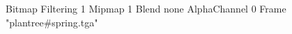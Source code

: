 {Bitmap
	{Filtering 1}
	{Mipmap 1}
	{Blend none}
	{AlphaChannel 0}
	{Frame "plantree#spring.tga"}
}
